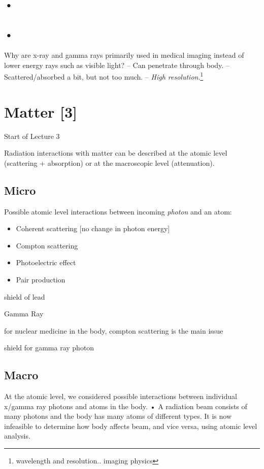 \documentclass[UTF8,a4paper,11pt]{book}
\theoremstyle{mystyle}{
  \newtheorem{example}{Example}
}
\begin{document}
\subsection{•}
\subsection{•}

\begin{example}
 Why are x-ray and gamma rays primarily used
in medical imaging instead of lower energy
rays such as visible light?
– Can penetrate through body.
– Scattered/absorbed a bit, but not too much.
– \emph{High resolution}.\footnote{wavelength and resolution.. imaging physics}
\end{example}

\section{Matter [3]}
{\sf Start of Lecture 3}

 Radiation interactions with matter can be
described at the atomic level (scattering +
absorption) or at the macroscopic level
(attenuation).

\subsection{Micro}
Possible atomic level interactions between
incoming \emph{photon} and an atom:
\begin{itemize}
\item Coherent scattering [no change in photon energy]


\item Compton scattering


\item Photoelectric effect


\item Pair production


\end{itemize}


shield of lead

Gamma Ray

for nuclear medicine in the body, compton scattering is the main issue

shield for gamma ray photon

\subsection{Macro}
 At the atomic level, we considered possible
interactions between individual x/gamma ray
photons and atoms in the body.
• A radiation beam consists of many photons
and the body has many atoms of different
types.
It is now infeasible to determine how body affects
beam, and vice versa, using atomic level
analysis.
\end{document}

